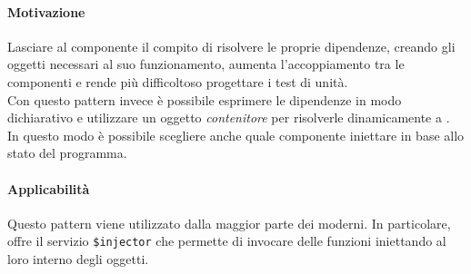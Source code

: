 \paragraph{Motivazione}
Lasciare al componente il compito di risolvere le proprie dipendenze, creando gli oggetti necessari al suo funzionamento, aumenta l'accoppiamento tra le componenti e rende più difficoltoso progettare i test di unità.\\
Con questo pattern invece è possibile esprimere le dipendenze in modo dichiarativo e utilizzare un oggetto \textit{contenitore} per risolverle dinamicamente a . In questo modo è possibile scegliere anche quale componente iniettare in base allo stato del programma.\\
\paragraph{Applicabilità}
Questo pattern viene utilizzato dalla maggior parte dei  moderni. In particolare,  offre il servizio \texttt{\$injector} che permette di invocare delle funzioni iniettando al loro interno degli oggetti.

